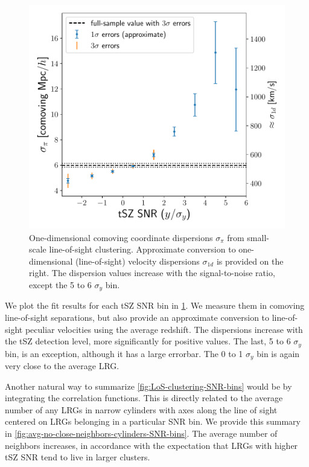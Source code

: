\begin{figure}[hbtp]
    \centering
    \includegraphics[width=\linewidth]{fig/LRG-z0.4-0.85-SZ-ACTPlanck-filtered2.4-LoS-jack-errorbars-sigmas.pdf}
    \caption[Coordinate and velocity dispersions from small-scale line-of-sight clustering]{One-dimensional comoving coordinate dispersions $\sigma_\pi$ from small-scale line-of-sight clustering.
    Approximate conversion to one-dimensional (line-of-sight) velocity dispersions $\sigma_{1d}$ is provided on the right.
    The dispersion values increase with the signal-to-noise ratio, except the 5 to 6 $\sigma_y$ bin.}
    \label{fig:LoS-sigmas-SNR-bins}
\end{figure}

We plot the fit results for each tSZ SNR bin in \cref{fig:LoS-sigmas-SNR-bins}.
We measure them in comoving line-of-sight separations, but also provide an approximate conversion to line-of-sight peculiar velocities using the average redshift.
The dispersions increase with the tSZ detection level, more significantly for positive values.
The last, 5 to 6 $\sigma_y$ bin, is an exception, although it has a large errorbar.
The 0 to 1 $\sigma_y$ bin is again very close to the average LRG.

Another natural way to summarize \cref{fig:LoS-clustering-SNR-bins} would be by integrating the correlation functions.
This is directly related to the average number of any LRGs in narrow cylinders with axes along the line of sight centered on LRGs belonging in a particular SNR bin.
We provide this summary in \cref{fig:avg-no-close-neighbors-cylinders-SNR-bins}.
The average number of neighbors increases, in accordance with the expectation that LRGs with higher tSZ SNR tend to live in larger clusters.

